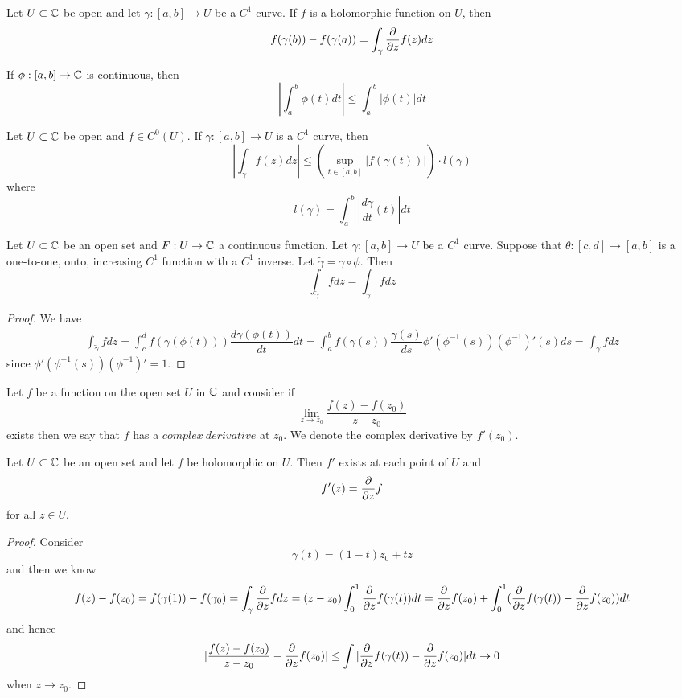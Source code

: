 \begin{proposition}
    Let $U\subset \mathbb{C}$ be open and let $\gamma:[a,b]\to U$ be a $C^1$ curve. If $f$ is a holomorphic function on $U$, then
    \[f(\gamma(b)) - f(\gamma(a)) = \int_{\gamma} \dfrac{\partial}{\partial z} f(z)dz\]
\end{proposition}

\begin{proposition}
If $\phi:[a,b] \to \mathbb{C}$ is continuous, then
\[|\int_a^b \phi(t)dt|\leq \int_a^b |\phi(t)|dt\]
\end{proposition}

\begin{proposition}
Let $U \subset \mathbb{C}$ be open and $f\in C^0(U)$. If $\gamma:[a,b]\to U$ is a $C^1$ curve, then
\[|\int_{\gamma} f(z)dz| \leq (\sup_{t\in[a,b]} |f(\gamma(t))|)\cdot l(\gamma)\]
where
\[l(\gamma) = \int_a^b |\dfrac{d\gamma}{dt}(t)|dt\]
\end{proposition}

\begin{proposition}
    Let $U\subset \mathbb{C}$ be an open set and $F:U\to\mathbb{C}$ a continuous function. Let $\gamma:[a,b]\to U$ be a $C^1$ curve. Suppose that $\theta: [c,d]\to[a,b]$ is a one-to-one, onto, increasing $C^1$ function with a $C^1$ inverse. Let $\tilde{\gamma} = \gamma \circ \phi$. Then
    \[\int_{\tilde{\gamma}} fdz = \int_{\gamma} fdz\]
\end{proposition}
\begin{proof}\par
    We have
    \[
    \begin{aligned}
        \int_{\tilde{\gamma}} fdz = \int_c^d f(\gamma(\phi(t))) \dfrac{d\gamma(\phi(t))}{dt} dt = \int_a^b f(\gamma(s)) \dfrac{\gamma(s)}{ds} \phi'(\phi^{-1}(s)) (\phi^{-1})'(s)ds = \int_{\gamma} fdz
    \end{aligned}
    \]
    since $\phi'(\phi^{-1}(s))(\phi^{-1})' = 1$.
\end{proof}

\begin{definition}
    Let $f$ be a function on the open set $U$ in $\mathbb{C}$ and consider if 
    \[\lim_{z\to z_0} \dfrac{f(z)-f(z_0)}{z-z_0}\]
    exists then we say that $f$ has a $complex\ derivative$ at $z_0$. We denote the complex derivative by $f'(z_0)$. 
\end{definition}

\begin{theorem}
    Let $U\subset \mathbb{C}$ be an open set and let $f$ be holomorphic on $U$. Then $f'$ exists at each point of $U$ and
    \[f'(z) = \dfrac{\partial}{\partial z} f\]
    for all $z\in U$.
\end{theorem}
\begin{proof}\par
    Consider
    \[\gamma(t) = (1-t)z_0 + tz\]
    and then we know
    \[f(z)-f(z_0) = f(\gamma(1)) - f(\gamma_0) = \int_{\gamma} \dfrac{\partial}{\partial z} fdz = (z-z_0) \int_0^1 \dfrac{\partial}{\partial z} f(\gamma(t)) dt = \dfrac{\partial}{\partial z} f(z_0) + \int_0^1(\dfrac{\partial}{\partial z} f (\gamma(t))- \dfrac{\partial}{\partial z} f(z_0))dt\]
    and hence
    \[|\dfrac{f(z)-f(z_0)}{z-z_0}- \dfrac{\partial}{\partial z} f(z_0)| \leq \int |\dfrac{\partial}{\partial z} f(\gamma(t))- \dfrac{\partial}{\partial z} f(z_0)|dt \to 0\]
    when $z\to z_0$.
\end{proof}

